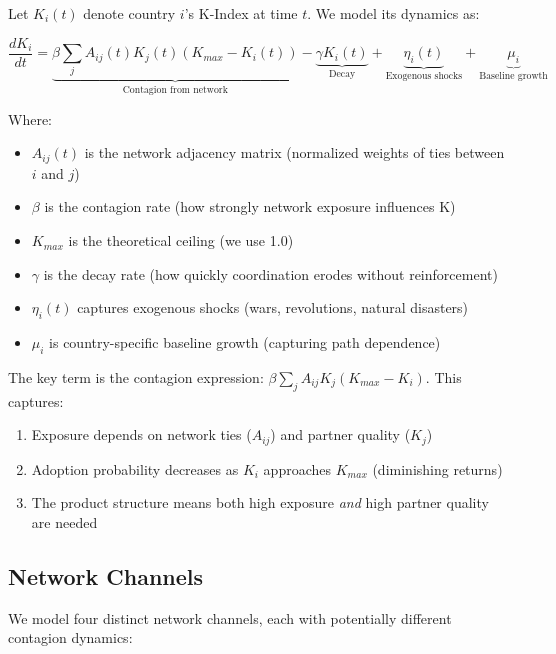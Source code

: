 \documentclass[12pt,a4paper]{article}
\begin{document}
Let $K_i(t)$ denote country $i$'s K-Index at time $t$. We model its dynamics as:

\begin{equation}
\frac{dK_i}{dt} = \underbrace{\beta \sum_j A_{ij}(t) K_j(t) (K_{max} - K_i(t))}_{\text{Contagion from network}} - \underbrace{\gamma K_i(t)}_{\text{Decay}} + \underbrace{\eta_i(t)}_{\text{Exogenous shocks}} + \underbrace{\mu_i}_{\text{Baseline growth}}
\label{eq:sir_basic}
\end{equation}

Where:
\begin{itemize}
    \item $A_{ij}(t)$ is the network adjacency matrix (normalized weights of ties between $i$ and $j$)
    \item $\beta$ is the contagion rate (how strongly network exposure influences K)
    \item $K_{max}$ is the theoretical ceiling (we use 1.0)
    \item $\gamma$ is the decay rate (how quickly coordination erodes without reinforcement)
    \item $\eta_i(t)$ captures exogenous shocks (wars, revolutions, natural disasters)
    \item $\mu_i$ is country-specific baseline growth (capturing path dependence)
\end{itemize}

The key term is the contagion expression: $\beta \sum_j A_{ij} K_j (K_{max} - K_i)$. This captures:
\begin{enumerate}
    \item Exposure depends on network ties ($A_{ij}$) and partner quality ($K_j$)
    \item Adoption probability decreases as $K_i$ approaches $K_{max}$ (diminishing returns)
    \item The product structure means both high exposure \textit{and} high partner quality are needed
\end{enumerate}

\subsection{Network Channels}

We model four distinct network channels, each with potentially different contagion dynamics:
\end{document}
